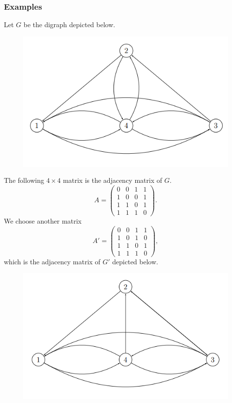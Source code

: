 \documentclass{beamer}
\begin{document}
\begin{frame}
    \frametitle{Examples}
    Let $G$ be the digraph depicted below. 
    \begin{figure}
        \includegraphics[scale = 0.5]{exam3_10.PNG}
    \end{figure}
    

\end{frame}

\begin{frame}
    The following $4\times 4$ matrix is the adjacency matrix of $G$. 
    $$A=\begin{pmatrix}
    0 & 0 & 1 & 1\\
    1 & 0 & 0 & 1\\
    1 & 1 & 0 & 1\\
    1 & 1 & 1 & 0
    \end{pmatrix}.$$ 
We choose another matrix 
    $$A'=\begin{pmatrix}
    0 & 0 & 1 & 1\\
    1 & 0 & 1 & 0\\
    1 & 1 & 0 & 1\\
    1 & 1 & 1 & 0
    \end{pmatrix},$$
which is the adjacency matrix of $G'$ depicted below. 
\end{frame}

\begin{frame}
    \begin{figure}
        \includegraphics[scale = 0.5]{exam3_11.PNG}
    \end{figure}
    
\end{frame}
\end{document}
